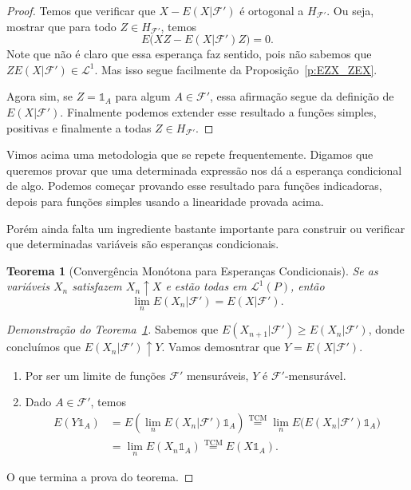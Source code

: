 \documentclass[reqno, draft]{book}
\newcommand*\1{\mathds{1}}
\newtheorem{theorem}{Teorema}[section]
\begin{document}
\begin{proof}
  Temos que verificar que $X - E(X|\mathcal{F}')$ é ortogonal a $H_{\mathcal{F}'}$.
  Ou seja, mostrar que para todo $Z \in H_{\mathcal{F}'}$, temos
  \begin{equation}
    E\big( XZ - E(X|\mathcal{F}') Z \big) = 0.
  \end{equation}
  Note que não é claro que essa esperança faz sentido, pois não sabemos que $ZE(X|\mathcal{F}') \in \mathcal{L}^1$.
  Mas isso segue facilmente da Proposição~\ref{p:EZX_ZEX}.

  Agora sim, se $Z = \1_{A}$ para algum $A \in \mathcal{F}'$, essa afirmação segue da definição de $E(X|\mathcal{F}')$.
  Finalmente podemos extender esse resultado a funções simples, positivas e finalmente a todas $Z \in H_{\mathcal{F}'}$.
\end{proof}

Vimos acima uma metodologia que se repete frequentemente.
Digamos que queremos provar que uma determinada expressão nos dá a esperança condicional de algo.
Podemos começar provando esse resultado para funções indicadoras, depois para funções simples usando a linearidade provada acima.

Porém ainda falta um ingrediente bastante importante para construir ou verificar que determinadas variáveis são esperanças condicionais.

\begin{theorem}[Convergência Monótona para Esperanças Condicionais]
  \label{t:TCM_EC}
  Se as variáveis $X_n$ satisfazem $X_n \uparrow X$ e estão todas em $\mathcal{L}^1(P)$, então
  \begin{equation}
    \lim_n E(X_n|\mathcal{F}') = E(X|\mathcal{F}').
  \end{equation}
\end{theorem}

\begin{proof}[Demonstração do Teorema~\ref{t:TCM_EC}]
  Sabemos que $E(X_{n+1} | \mathcal{F}') \geq E(X_n|\mathcal{F}')$, donde concluímos que $E(X_n|\mathcal{F}') \uparrow Y$.
  Vamos demosntrar que $Y = E(X|\mathcal{F}')$.
  \begin{enumerate}[\quad a)]
  \item Por ser um limite de funções $\mathcal{F}'$ mensuráveis, $Y$ é $\mathcal{F}'$-mensurável.
  \item Dado $A \in \mathcal{F}'$, temos
    \begin{equation}
      \begin{split}
        E(Y \1_A) & = E(\lim_n E(X_n |\mathcal{F}') \1_A) \overset{\text{TCM}}= \lim_n E\big( E(X_n|\mathcal{F}') \1_A \big)\\
        & = \lim_n E(X_n \1_A) \overset{\text{TCM}}= E(X \1_A).
      \end{split}
    \end{equation}
  \end{enumerate}
  O que termina a prova do teorema.
\end{proof}
\end{document}
